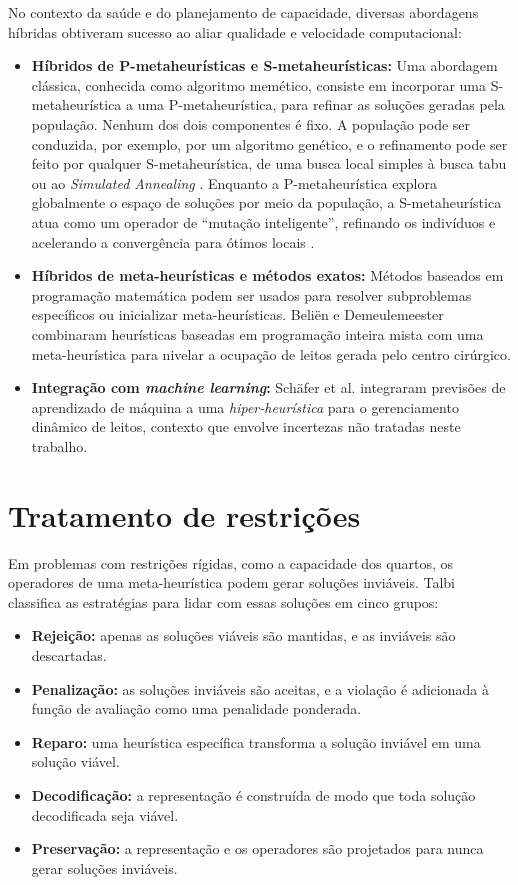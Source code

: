 No contexto da saúde e do planejamento de capacidade, diversas abordagens híbridas obtiveram sucesso ao aliar qualidade e velocidade computacional:
\begin{itemize}
    \item \textbf{Híbridos de P-metaheurísticas e S-metaheurísticas:} Uma abordagem clássica, conhecida como algoritmo memético, consiste em incorporar uma S-metaheurística a uma P-metaheurística, para refinar as soluções geradas pela população. Nenhum dos dois componentes é fixo. A população pode ser conduzida, por exemplo, por um algoritmo genético, e o refinamento pode ser feito por qualquer S-metaheurística, de uma busca local simples à busca tabu ou ao \textit{Simulated Annealing} \cite{talbi2009metaheuristics}. Enquanto a P-metaheurística explora globalmente o espaço de soluções por meio da população, a S-metaheurística atua como um operador de ``mutação inteligente'', refinando os indivíduos e acelerando a convergência para ótimos locais \cite{talbi2009metaheuristics}.
    \item \textbf{Híbridos de meta-heurísticas e métodos exatos:} Métodos baseados em programação matemática podem ser usados para resolver subproblemas específicos ou inicializar meta-heurísticas. Beliën e Demeulemeester \cite{belien2007building} combinaram heurísticas baseadas em programação inteira mista com uma meta-heurística para nivelar a ocupação de leitos gerada pelo centro cirúrgico.
    \item \textbf{Integração com \textit{machine learning}:} Schäfer et al. \cite{schafer2023combining} integraram previsões de aprendizado de máquina a uma \textit{hiper-heurística} para o gerenciamento dinâmico de leitos, contexto que envolve incertezas não tratadas neste trabalho.
\end{itemize}


\section{Tratamento de restrições}
\label{sec:tratamento-restricoes}

Em problemas com restrições rígidas, como a capacidade dos quartos, os operadores de uma meta-heurística podem gerar soluções inviáveis. Talbi \cite{talbi2009metaheuristics} classifica as estratégias para lidar com essas soluções em cinco grupos:

\begin{itemize}
    \item \textbf{Rejeição:} apenas as soluções viáveis são mantidas, e as inviáveis são descartadas.
    \item \textbf{Penalização:} as soluções inviáveis são aceitas, e a violação é adicionada à função de avaliação como uma penalidade ponderada.
    \item \textbf{Reparo:} uma heurística específica transforma a solução inviável em uma solução viável.
    \item \textbf{Decodificação:} a representação é construída de modo que toda solução decodificada seja viável.
    \item \textbf{Preservação:} a representação e os operadores são projetados para nunca gerar soluções inviáveis.
\end{itemize}

